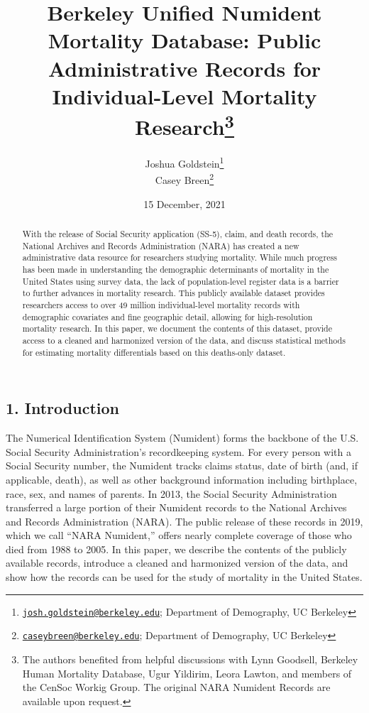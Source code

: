 \documentclass[
  11pt,
]{article}
\title{Berkeley Unified Numident Mortality Database: Public
Administrative Records for Individual-Level Mortality
Research\footnote{The authors benefited from helpful discussions with
  Lynn Goodsell, Berkeley Human Mortality Database, Ugur Yildirim, Leora
  Lawton, and members of the CenSoc Workig Group. The original NARA
  Numident Records are available upon request.}}
\author{Joshua Goldstein\footnote{\href{mailto:josh.goldstein@berkeley.edu}{\nolinkurl{josh.goldstein@berkeley.edu}};
  Department of Demography, UC Berkeley}\\
Casey Breen\footnote{\href{mailto:caseybreen@berkeley.edu}{\nolinkurl{caseybreen@berkeley.edu}};
  Department of Demography, UC Berkeley}}
\date{15 December, 2021}
\begin{document}
\maketitle
\begin{abstract}
With the release of Social Security application (SS-5), claim, and death
records, the National Archives and Records Administration (NARA) has
created a new administrative data resource for researchers studying
mortality. While much progress has been made in understanding the
demographic determinants of mortality in the United States using survey
data, the lack of population-level register data is a barrier to further
advances in mortality research. This publicly available dataset provides
researchers access to over 49 million individual-level mortality records
with demographic covariates and fine geographic detail, allowing for
high-resolution mortality research. In this paper, we document the
contents of this dataset, provide access to a cleaned and harmonized
version of the data, and discuss statistical methods for estimating
mortality differentials based on this deaths-only dataset. \newpage
\end{abstract}

{
\setcounter{tocdepth}{3}
\tableofcontents
}
\newpage

\hypertarget{introduction}{%
\subsection{1. Introduction}\label{introduction}}

The Numerical Identification System (Numident) forms the backbone of the
U.S. Social Security Administration's recordkeeping system. For every
person with a Social Security number, the Numident tracks claims status,
date of birth (and, if applicable, death), as well as other background
information including birthplace, race, sex, and names of parents. In
2013, the Social Security Administration transferred a large portion of
their Numident records to the National Archives and Records
Administration (NARA). The public release of these records in 2019,
which we call ``NARA Numident,'' offers nearly complete coverage of
those who died from 1988 to 2005. In this paper, we describe the
contents of the publicly available records, introduce a cleaned and
harmonized version of the data, and show how the records can be used for
the study of mortality in the United States.
\end{document}
